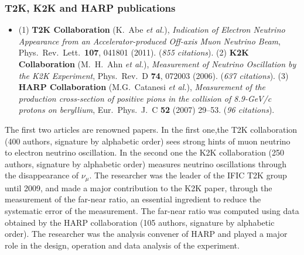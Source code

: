 
\subsubsection*{T2K, K2K and HARP publications}
\begin{itemize}
\item (1) {\bf T2K Collaboration} (K.~Abe {\it et al.}), {\it Indication of Electron Neutrino Appearance from an Accelerator-produced Off-axis Muon Neutrino Beam}, Phys.\ Rev.\ Lett.\  {\bf 107}, 041801 (2011). ({\it 855 citations}). (2) {\bf K2K Collaboration} (M.~H.~Ahn {\it et al.}), {\it Measurement of Neutrino Oscillation by the K2K Experiment}, Phys.\ Rev.\ D {\bf 74}, 072003 (2006). ({\it 637 citations}). (3) {\bf HARP Collaboration} (M.G.~Catanesi \textit{et al.}), \textit{Measurement of the production cross-section of positive pions in the collision of 8.9-GeV/c protons on beryllium}, Eur.\ Phys.\ J.\ C {\bf52} (2007) 29--53. ({\it 96 citations}).
\end{itemize}
The first two articles are renowned papers. In the first one,the T2K collaboration (400 authors, signature by alphabetic order) sees strong hints of muon neutrino to electron neutrino oscillation. In the second one the K2K collaboration (250 authors, signature by alphabetic order) measures neutrino oscillations  through the disappearance of $\nu_\mu$. The researcher was the leader of the IFIC T2K group until 2009, and made a major contribution to the K2K paper, through the measurement of the far-near ratio, an essential ingredient to reduce the systematic error of the measurement. The far-near ratio was computed using data obtained by the HARP collaboration (105 authors, signature by alphabetic order). The researcher was the analysis convener of HARP and played a major role in the design, operation and data analysis of the experiment.
 	
